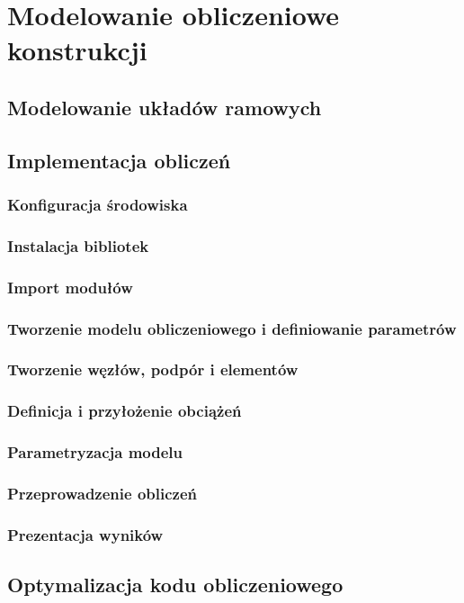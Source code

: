 \newpage
\section{Modelowanie obliczeniowe konstrukcji}

    \subsection{Modelowanie układów ramowych}

    \subsection{Implementacja obliczeń}
        \subsubsection{Konfiguracja środowiska}
        \subsubsection{Instalacja bibliotek}
        \subsubsection{Import modułów}
        \subsubsection{Tworzenie modelu obliczeniowego i definiowanie parametrów}
        \subsubsection{Tworzenie węzłów, podpór i elementów}
        \subsubsection{Definicja i przyłożenie obciążeń}
        \subsubsection{Parametryzacja modelu}
        \subsubsection{Przeprowadzenie obliczeń}
        \subsubsection{Prezentacja wyników}

    \subsection{Optymalizacja kodu obliczeniowego}
